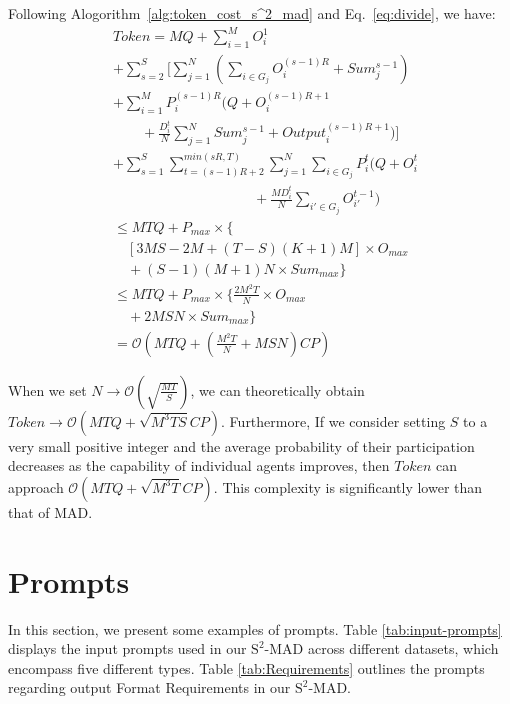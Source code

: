 Following Alogorithm~\ref{alg:token_cost_s^2_mad} and Eq.~\ref{eq:divide}, we have: 
\begin{equation}
\begin{aligned}
    &Token = MQ + \sum_{i=1}^M O_i^1 \\
    &+ \sum_{s=2}^S [\sum_{j=1}^N(\sum_{i\in G_j} O_i^{(s-1)R}+Sum_j^{s-1}) \\
    &+\sum_{i=1}^MP_i^{(s-1)R}(Q+O_i^{(s-1)R+1}\\
    &\qquad+\frac{D_i^t}{N}\sum_{j=1}^N Sum_j^{s-1} +Output_i^{(s-1)R+1})]\\
    &+\sum_{s=1}^S \sum_{t=(s-1)R+2}^{min(sR,T)}\sum_{j=1}^N\sum_{i\in G_j}P_i^t(Q+O_i^t\\
    &\qquad\qquad\qquad\qquad\qquad+\frac{MD_i^t}{N}\sum_{i' \in G_j}O_{i'}^{t-1}) \\
    & \leq MTQ + P_{max} \times \{\\
    &\quad[3MS-2M+(T-S)(K+1)M] \times O_{max}\\
    &\quad+ (S-1)(M+1)N\times Sum_{max} \}\\
    & \leq MTQ+P_{max} \times \{\frac{2M^2T}{N}\times O_{max} \\
    &\quad+ 2MSN\times Sum_{max}\} \\
    & = \mathcal{O}\left(MTQ+(\frac{M^2T}{N}+MSN)CP\right)
\end{aligned}
\end{equation}

When we set $N \rightarrow \mathcal{O}\left(\sqrt{\frac{MT}{S}}\right)$, we can theoretically obtain $Token \rightarrow \mathcal{O}\left(MTQ+\sqrt{M^3TS}CP\right)$. Furthermore, If we consider setting $S$ to a very small positive integer and the average probability of their participation decreases as the capability of individual agents improves, then $Token$ can approach $\mathcal{O}\left(MTQ+\sqrt{M^3T}CP\right)$. This complexity is significantly lower than that of MAD.

\section{Prompts} \label{appendix:prompts}
In this section, we present some examples of prompts. Table \ref{tab:input-prompts} displays the input prompts used in our \({\text{S}^2\text{-MAD}}\) across different datasets, which encompass five different types. Table \ref{tab:Requirements} outlines the prompts regarding output Format Requirements in our \({\text{S}^2\text{-MAD}}\).

